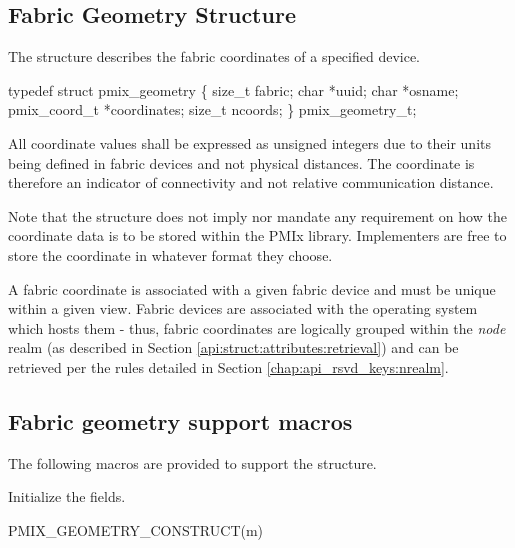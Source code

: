 \subsection{Fabric Geometry Structure}

The  structure describes the fabric coordinates of a specified device.

\cspecificstart
\begin{codepar}
typedef struct pmix_geometry \{
    size_t fabric;
    char *uuid;
    char *osname;
    pmix_coord_t *coordinates;
    size_t ncoords;
\} pmix_geometry_t;
\end{codepar}
\cspecificend

All coordinate values shall be expressed as unsigned integers due to their units being defined in fabric devices and not physical distances. The coordinate is therefore an indicator of connectivity and not relative communication distance.

\adviceimplstart
Note that the  structure does not imply nor mandate any requirement on how the coordinate data is to be stored within the \ac{PMIx} library. Implementers are free to store the coordinate in whatever format they choose.
\adviceimplend

A fabric coordinate is associated with a given fabric device and must be unique within a given view. Fabric devices are associated with the operating system which hosts them - thus, fabric coordinates are logically grouped within the \emph{node} realm (as described in Section \ref{api:struct:attributes:retrieval}) and can be retrieved per the rules detailed in Section \ref{chap:api_rsvd_keys:nrealm}.


\subsection{Fabric geometry support macros}
\label{api:netgeom:macros}

The following macros are provided to support the  structure.


Initialize the  fields.

\cspecificstart
\begin{codepar}
PMIX_GEOMETRY_CONSTRUCT(m)
\end{codepar}
\cspecificend

